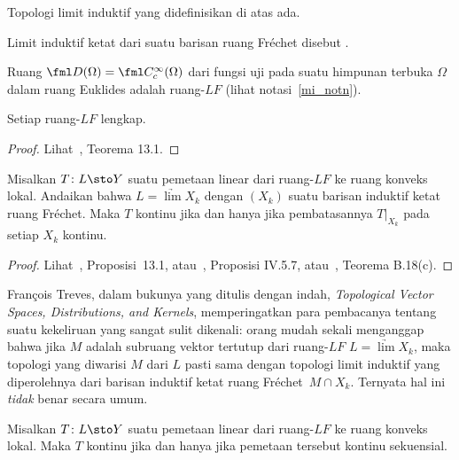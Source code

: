 \begin{prop} Topologi limit induktif yang didefinisikan di atas ada.
\end{prop}

\begin{defn} Limit induktif ketat dari suatu barisan ruang Fr\'echet disebut
.
\end{defn}

\begin{exam} Ruang $\fml D(\Omega) = \fml C^\infty_c(\Omega)$ dari fungsi uji pada suatu himpunan terbuka $\Omega$ dalam ruang Euklides
adalah ruang-$LF$ (lihat notasi~\ref{mi_notn}).
\end{exam}

\begin{prop} Setiap ruang-$LF$ lengkap.
\end{prop}

\begin{proof} Lihat~\cite{Treves:1967}, Teorema 13.1.  \ns
\end{proof}

\begin{prop} Misalkan $T\colon L \sto Y$ suatu pemetaan linear dari ruang-$LF$ ke ruang konveks lokal. Andaikan bahwa $L = \underrightarrow{\lim}X_k$
dengan $(X_k)$ suatu barisan induktif ketat ruang Fr\'echet. Maka $T$ kontinu jika dan hanya jika pembatasannya $T\bigr|_{X_k}$
pada setiap $X_k$ kontinu.
\end{prop}

\begin{proof} Lihat~\cite{Treves:1967}, Proposisi~13.1, atau~\cite{Conway:1990}, Proposisi IV.5.7, atau~\cite{Grubb:2009}, Teorema B.18(c).  \ns
\end{proof}

\begin{cau} Fran\c{c}ois Treves, dalam bukunya yang ditulis dengan indah, \emph{Topological Vector Spaces, Distributions, and Kernels}, memperingatkan
para pembacanya tentang suatu kekeliruan yang sangat sulit dikenali: orang mudah sekali menganggap bahwa jika $M$ adalah subruang vektor tertutup dari ruang-$LF$
$L = \underrightarrow{\lim}X_k$, maka topologi yang diwarisi $M$ dari $L$ pasti sama dengan topologi limit induktif yang diperolehnya
dari barisan induktif ketat ruang Fr\'echet~$M \cap X_k$. Ternyata hal ini \emph{tidak} benar secara umum.
\end{cau}

\begin{prop} Misalkan $T\colon L \sto Y$ suatu pemetaan linear dari ruang-$LF$ ke ruang konveks lokal. Maka $T$ kontinu jika dan hanya jika
pemetaan tersebut kontinu sekuensial.
\end{prop}

















